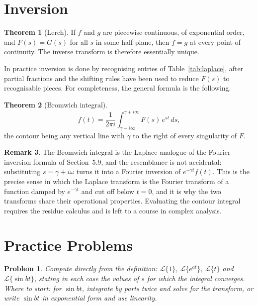 \documentclass[12pt,a4paper]{report}
\theoremstyle{definition}
\newtheorem{thm}{Theorem}[section]
\newtheorem{remark}[thm]{Remark}
\theoremstyle{plain}
\newtheorem{problemx}{Problem}[section]
\newenvironment{problem}{\begin{problemx}}{\end{problemx}}
\begin{document}
\section{Inversion}

\begin{thm}[Lerch]
If $f$ and $g$ are piecewise continuous, of exponential order, and
$F(s)=G(s)$ for all $s$ in some half-plane, then $f=g$ at every point of
continuity. The inverse transform is therefore essentially unique.
\end{thm}

In practice inversion is done by recognising entries of
Table~\ref{tab:laplace}, after partial fractions and the shifting rules have
been used to reduce $F(s)$ to recognisable pieces. For completeness, the general
formula is the following.

\begin{thm}[Bromwich integral]
$$f(t) = \frac{1}{2\pi i}\int^{\gamma+i\infty}_{\gamma-i\infty}F(s)\,e^{st}\,ds,$$
the contour being any vertical line with $\gamma$ to the right of every
singularity of $F$.
\end{thm}

\begin{remark}
The Bromwich integral is the Laplace analogue of the Fourier inversion formula
of Section~5.9, and the resemblance is not accidental: substituting
$s=\gamma+i\omega$ turns it into a Fourier inversion of $e^{-\gamma t}f(t)$.
This is the precise sense in which the Laplace transform is the Fourier
transform of a function damped by $e^{-\gamma t}$ and cut off below $t=0$, and
it is why the two transforms share their operational properties. Evaluating the
contour integral requires the residue calculus and is left to a course in
complex analysis.
\end{remark}

\section{Practice Problems}

\begin{problem}
Compute directly from the definition:
$\mathcal{L}\{1\}$, $\mathcal{L}\{e^{at}\}$, $\mathcal{L}\{t\}$ and
$\mathcal{L}\{\sin bt\}$, stating in each case the values of $s$ for which the
integral converges.
\emph{Where to start: for $\sin bt$, integrate by parts twice and solve for the
transform, or write $\sin bt$ in exponential form and use linearity.}
\end{problem}
\end{document}
